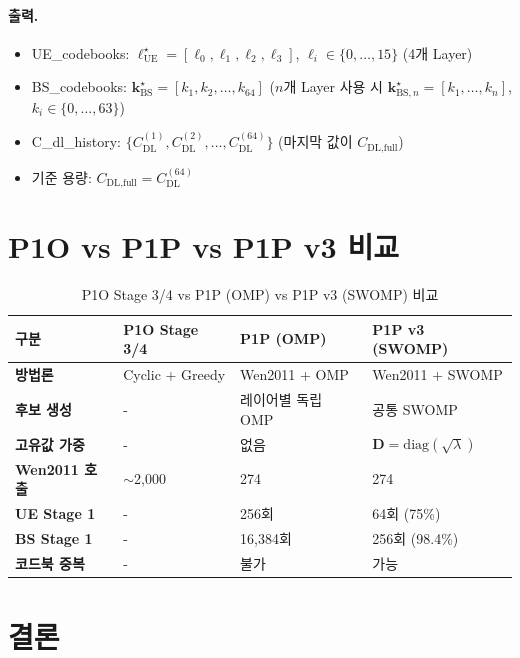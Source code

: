 \documentclass[10pt]{article}
\begin{document}
\paragraph{출력.}
\begin{itemize}
    \item UE\_codebooks: $\boldsymbol{\ell}_{\text{UE}}^{\star} = [\ell_0, \ell_1, \ell_2, \ell_3]$, $\ell_i \in \{0, \ldots, 15\}$ (4개 Layer)
    \item BS\_codebooks: $\boldsymbol{k}_{\text{BS}}^{\star} = [k_1, k_2, \ldots, k_{64}]$ ($n$개 Layer 사용 시 $\boldsymbol{k}_{\text{BS},n}^{\star} = [k_1, \ldots, k_n]$, $k_i \in \{0, \ldots, 63\}$)
    \item C\_dl\_history: $\{C_{\text{DL}}^{(1)}, C_{\text{DL}}^{(2)}, \ldots, C_{\text{DL}}^{(64)}\}$ (마지막 값이 $C_{\text{DL,full}}$)
    \item 기준 용량: $C_{\text{DL,full}} = C_{\text{DL}}^{(64)}$
\end{itemize}

\section{P1O vs P1P vs P1P v3 비교}

\begin{table}[H]
\centering
\begin{tabular}{|l|l|l|l|}
\hline
\textbf{구분} & \textbf{P1O Stage 3/4} & \textbf{P1P (OMP)} & \textbf{P1P v3 (SWOMP)} \\ \hline\hline
\textbf{방법론} & Cyclic + Greedy & Wen2011 + OMP & Wen2011 + SWOMP \\ \hline
\textbf{후보 생성} & - & 레이어별 독립 OMP & 공통 SWOMP \\ \hline
\textbf{고유값 가중} & - & 없음 & $\mathbf{D} = \text{diag}(\sqrt{\lambda})$ \\ \hline
\textbf{Wen2011 호출} & $\sim$2,000 & 274 & 274 \\ \hline
\textbf{UE Stage 1} & - & 256회 & 64회 (75\%) \\ \hline
\textbf{BS Stage 1} & - & 16,384회 & 256회 (98.4\%) \\ \hline
\textbf{코드북 중복} & - & 불가 & 가능 \\ \hline
\end{tabular}
\caption{P1O Stage 3/4 vs P1P (OMP) vs P1P v3 (SWOMP) 비교}
\end{table}

\section{결론}
\end{document}
